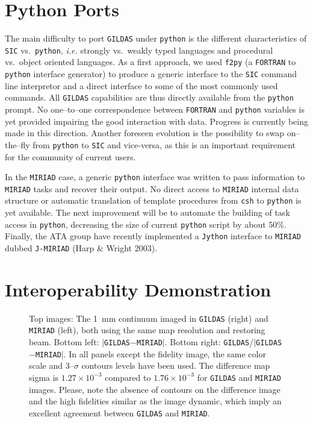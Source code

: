 \documentclass[11pt,twoside]{article}  %
\newcommand{\FORTRAN}{\texttt{FORTRAN}}
\newcommand{\GILDAS}{\texttt{GILDAS}}
\newcommand{\MIRIAD}{\texttt{MIRIAD}}
\newcommand{\python}{\texttt{python}}
\newcommand{\fpig}{\texttt{f2py}}
\newcommand{\SIC}{\texttt{SIC}}
\newcommand{\ie} {{\em i.e.}}
\begin{document}
\section{Python Ports}

The main difficulty to port \GILDAS{} under \python{} is the different
characteristics of \SIC{} vs.\ \python{}, \ie{} strongly vs.\ weakly typed
languages and procedural vs.\ object oriented languages. As a first
approach, we used \fpig{} (a \FORTRAN{} to \python{} interface generator)
to produce a generic interface to the \SIC{} command line
interpretor and a direct interface to some of the most commonly used
commands. All \GILDAS{} capabilities are thus directly available from the
\python{} prompt. No one--to--one correspondence between \FORTRAN{} and
\python{} variables is yet provided impairing the good interaction with
data. Progress is currently being made in this direction. Another foreseen
evolution is the possibility to swap on--the--fly from \python{} to \SIC{}
and vice-versa, as this is an important requirement for the community of
current users.

In the \MIRIAD{} case, a generic \python{} interface was written to pass
information to \MIRIAD{} tasks and recover their output.  No direct access
to \MIRIAD{} internal data structure or automatic translation of template
procedures from \texttt{csh} to \python{} is yet available. The next
improvement will be to automate the building of task access in \python{},
decreasing the size of current \python{} script by about 50\%.  Finally,
the ATA group have recently implemented a \texttt{Jython} interface to
\MIRIAD{} dubbed \texttt{J-MIRIAD} (Harp \& Wright 2003).

\section{Interoperability Demonstration}

\begin{figure}[t]
  \caption{Top images: The 1~mm continuum imaged in \GILDAS{} (right) and
    \MIRIAD{} (left), both using the same map resolution and restoring
    beam.  Bottom left: $|$\GILDAS{}$-$\MIRIAD{}$|$. Bottom right:
    \GILDAS{}/$|$\GILDAS{}$-$\MIRIAD{}$|$. In all panels except the
    fidelity image, the same color scale and 3--$\sigma$ contours levels
    have been used. The difference map sigma is $1.27\times10^{-3}$ compared to
    $1.76\times10^{-3}$ for \GILDAS{} and \MIRIAD{} images. Please, note the
    absence of contours on the difference image and the high fidelities
    similar as the image dynamic, which imply an excellent agreement
    between \GILDAS{} and \MIRIAD{}.}
  \label{fig:P4-14_f2}
\end{figure}
\end{document}

